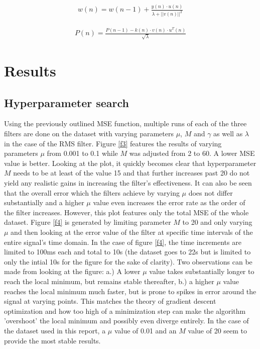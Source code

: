 \documentclass[10pt,a4paper,twocolumn]{article}
\begin{document}
\begin{eqnarray}
w(n) = w(n-1) + \frac{y(n)\cdot u(n)}{\lambda+||v(n)||^2}
\label{e11}
\end{eqnarray}

\begin{eqnarray}
P(n) = \frac{P(n-1) - k(n) \cdot v(n) \cdot u^T(n)}{\sqrt{\lambda}}
\label{e12}
\end{eqnarray}


\section*{Results}
\subsection*{Hyperparameter search}
Using the previously outlined MSE function, multiple runs of each of the three filters are done on the dataset with varying parameters $\mu$, $M$ and $\gamma$ as well as $\lambda$ in the case of the RMS filter. Figure \ref{f3} features the results of varying parameters $\mu$ from 0.001 to 0.1 while $M$ was adjusted from 2 to 60. A lower MSE value is better. Looking at the plot, it quickly becomes clear that hyperparameter $M$ needs to be at least of the value 15 and that further increases past 20 do not yield any realistic gains in increasing the filter's effectiveness. It can also be seen that the overall error which the filters achieve by varying $\mu$ does not differ substantially and a higher $\mu$ value even increases the error rate as the order of the filter increases. However, this plot features only the total MSE of the whole dataset. Figure \ref{f4} is generated by limiting parameter $M$ to 20 and only varying $\mu$ and then looking at the error value of the filter at specific time intervals of the entire signal's time domain. In the case of figure \ref{f4}, the time increments are limited to 100ms each and total to 10s (the dataset goes to 22s but is limited to only the intial 10s for the figure for the sake of clarity). Two observations can be made from looking at the figure: a.) A lower $\mu$ value takes substantially longer to reach the local minimum, but remains stable thereafter, b.) a higher $\mu$ value reaches the local minimum much faster, but is prone to spikes in error around the signal at varying points. This matches the theory of gradient descent optimization and how too high of a minimization step can make the algorithm 'overshoot' the local minimum and possibly even diverge entirely. In the case of the dataset used in this report, a $\mu$ value of 0.01 and an $M$ value of 20 seem to provide the most stable results.
\end{document}
